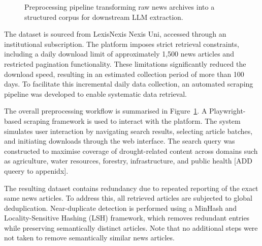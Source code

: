 \begin{figure}[h!]
    \centering
    \caption{Preprocessing pipeline transforming raw news archives into a structured corpus for downstream LLM extraction.}
    \label{fig:preprocessing_pipeline}
\end{figure}

The dataset is sourced from LexisNexis Nexis Uni, accessed through an institutional subscription. The platform imposes strict retrieval constraints, including a daily download limit of approximately 1,500 news articles and restricted pagination functionality. These limitations significantly reduced the download speed, resulting in an estimated collection period of more than 100 days. To facilitate this incremental daily data collection, an automated scraping pipeline was developed to enable systematic data retrieval.

The overall preprocessing workflow is summarised in Figure~\ref{fig:preprocessing_pipeline}. A Playwright-based scraping framework is used to interact with the platform. The system simulates user interaction by navigating search results, selecting article batches, and initiating downloads through the web interface. The search query was constructed to maximise coverage of drought-related content across domains such as agriculture, water resources, forestry, infrastructure, and public health [ADD queery to appenidx].

The resulting dataset contains redundancy due to repeated reporting of the exact same news articles. To address this, all retrieved articles are subjected to global deduplication. Near-duplicate detection is performed using a MinHash and Locality-Sensitive Hashing (LSH) framework, which removes redundant entries while preserving semantically distinct articles. Note that no additional steps were not taken to remove semantically similar news articles.


